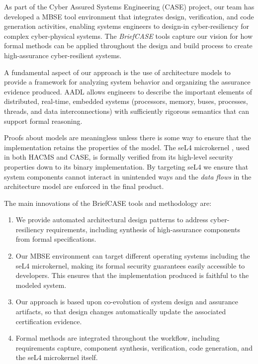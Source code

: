 As part of the Cyber Assured Systems Engineering (CASE) project,
our team has developed a MBSE tool environment that integrates design, verification,
and code generation activities, enabling systems engineers to design-in cyber-resiliency
for complex cyber-physical systems. The {\em BriefCASE} tools capture our 
vision for how formal methods can be applied throughout the design and build process 
to create high-assurance cyber-resilient systems.  

A fundamental aspect of our approach is the use of 
architecture models to provide a framework for analyzing
system behavior and organizing the assurance evidence produced.  
AADL allows engineers to describe the important elements of distributed,
real-time, embedded systems (processors, memory, buses, processes, 
threads, and data interconnections) with sufficiently rigorous semantics
that can support formal reasoning.  

Proofs about models are meaningless unless there is some way to ensure
that the implementation retains the properties of the model.  The seL4 
microkernel \cite{sel4-sosp09}, used in both HACMS and CASE, is
formally verified from its high-level security properties down to its binary implementation.  
By targeting seL4 we ensure that system components cannot interact in unintended 
ways and the \textit{data flows} in the architecture model are enforced in the
final product.  

The main innovations of the BriefCASE tools and methodology are:

\begin{enumerate}

\item We provide automated architectural design patterns to address cyber-resiliency requirements, 
including synthesis of high-assurance components from formal specifications.

\item Our MBSE environment can target different operating systems including the seL4 microkernel, 
making its formal security guarantees easily accessible to developers. This ensures that 
the implementation produced is faithful to the modeled system. 

\item Our approach is based upon co-evolution of system design and assurance artifacts, so that
design changes automatically update the associated certification evidence.

\item Formal methods are integrated throughout the workflow, including requirements capture,
component synthesis, verification, code generation, and the seL4 microkernel itself. 

\end{enumerate}




